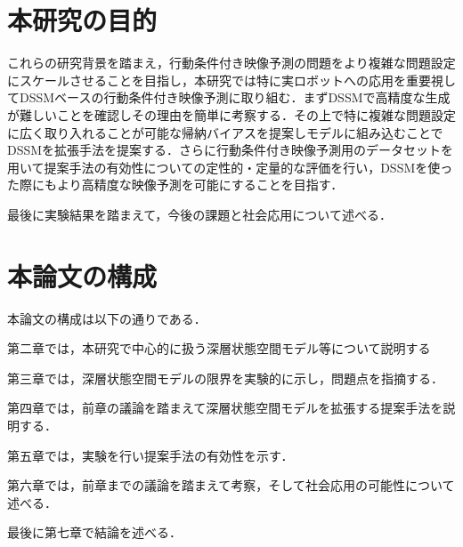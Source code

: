 \section{本研究の目的}

これらの研究背景を踏まえ，行動条件付き映像予測の問題をより複雑な問題設定にスケールさせることを目指し，本研究では特に実ロボットへの応用を重要視してDSSMベースの行動条件付き映像予測に取り組む．まずDSSMで高精度な生成が難しいことを確認しその理由を簡単に考察する．その上で特に複雑な問題設定に広く取り入れることが可能な帰納バイアスを提案しモデルに組み込むことでDSSMを拡張手法を提案する．さらに行動条件付き映像予測用のデータセットを用いて提案手法の有効性についての定性的・定量的な評価を行い，DSSMを使った際にもより高精度な映像予測を可能にすることを目指す．

最後に実験結果を踏まえて，今後の課題と社会応用について述べる．

\section{本論文の構成}

本論文の構成は以下の通りである．

第二章では，本研究で中心的に扱う深層状態空間モデル等について説明する

第三章では，深層状態空間モデルの限界を実験的に示し，問題点を指摘する．

第四章では，前章の議論を踏まえて深層状態空間モデルを拡張する提案手法を説明する．

第五章では，実験を行い提案手法の有効性を示す．

第六章では，前章までの議論を踏まえて考察，そして社会応用の可能性について述べる．

最後に第七章で結論を述べる．



